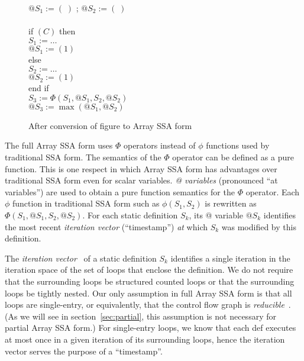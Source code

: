 \begin{figure}%
\begin{center}
\parbox{3.0in}{
\begin{programa}
\Ta $@S_1 := (\;)$ ;  $@S_2 := (\;)$\\
\\
\Ta  if $(C)$ then \\
\Tb   $S_1 := \ldots$ \\
\Tb   $@S_1 := (1)$ \\
\Ta  else  \\
\Tb   $S_2 := \ldots$ \\
\Tb   $@S_2 := (1)$ \\
\Ta  end if \\
\Ta  $S_3 := \Phi (S_1,@S_1,S_2,@S_2)$\\
\Ta  $@S_3 := \max(@S_1, @S_2)$
\end{programa}
}
\end{center}
\caption{After conversion of figure \protect{\ref{scalar-source}} to Array SSA form}
\label{our-phi}
\end{figure}

The full Array SSA form uses $\Phi$ operators instead of $\phi$
functions used by traditional SSA form. The semantics of the $\Phi$
operator can be defined as a pure function.  
This is one respect in which Array SSA form
has
advantages over traditional SSA form even for scalar variables.
{\it @ variables} (pronounced ``at variables'')
are used to obtain a pure function semantics for the
$\Phi$
operator. Each
$\phi$ function in traditional SSA form such as $\phi(S_1,S_2)$ is
rewritten as $\Phi(S_1,@S_1,S_2,@S_2)$.  For each static definition
$S_k$, its @ variable $@S_k$ identifies
the most recent {\em iteration vector} (``timestamp'') {\it
at} which $S_k$ was modified by this definition.

The {\it iteration vector}~\cite{Wolf89,Sark91} of a 
static 
definition $S_k$ identifies a single iteration in the iteration space of the
set of loops
that enclose the definition.  
We do
not require that the surrounding loops be structured
counted loops or that the
surrounding loops be tightly nested.  
Our only assumption in full Array SSA form
is that
all loops are single-entry, or equivalently, that the control flow
graph is {\it reducible}~\cite{Hech77,AhSU86}.
(As we will see in section~\ref{sec:partial}, this assumption is not necessary
for partial Array SSA form.)
For single-entry loops, we know that each def executes at most
once in a given iteration of its surrounding loops, hence the iteration vector
serves the purpose of a ``timestamp''.

